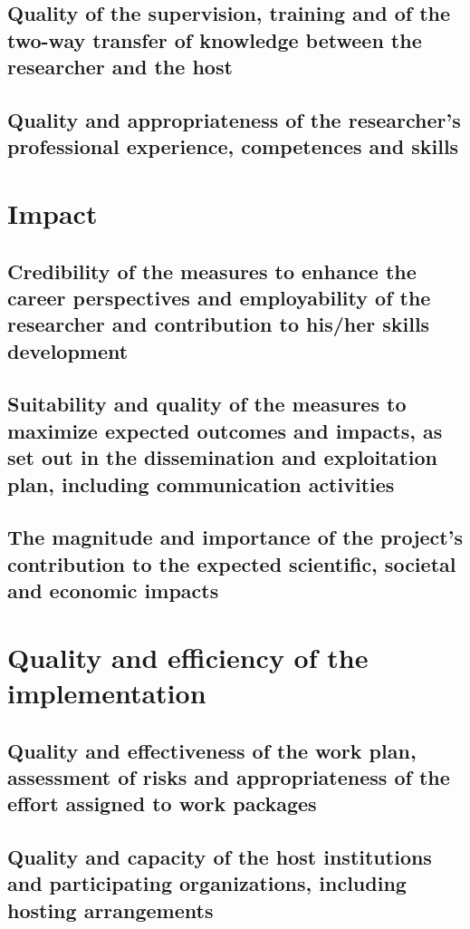 \documentclass[a4paper,11pt]{article}
\begin{document}
\subsection{Quality of the supervision, training and of the two-way transfer of knowledge between the researcher and the host}



\subsection{Quality and appropriateness of the researcher's professional experience, competences and skills}


\section{Impact}
\subsection{Credibility of the measures to enhance the career perspectives and employability of the researcher and contribution to his/her skills development}



\subsection{Suitability and quality of the measures to maximize expected outcomes and impacts, as set out in the dissemination and exploitation plan, including communication activities}


\subsection{The magnitude and importance of the project's contribution to the expected scientific, societal and economic impacts}



\section{Quality and efficiency of the implementation}
\subsection{Quality and effectiveness of the work plan, assessment of risks and appropriateness of the effort assigned to work packages}


\subsection{Quality and capacity of the host institutions and participating organizations, including hosting arrangements}
\end{document}
